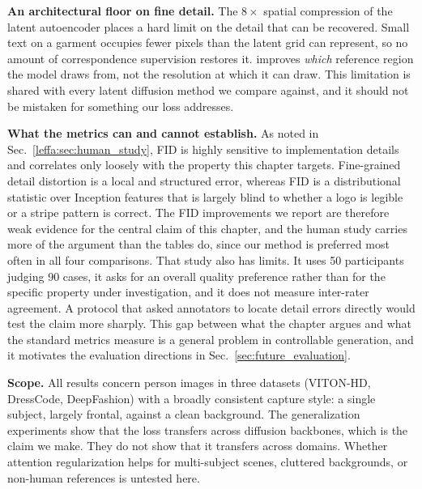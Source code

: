 \noindent \textbf{An architectural floor on fine detail.}
The $8\times$ spatial compression of the latent autoencoder places a hard limit on the detail that can be recovered. Small text on a garment occupies fewer pixels than the latent grid can represent, so no amount of correspondence supervision restores it. \leffa{} improves \emph{which} reference region the model draws from, not the resolution at which it can draw. This limitation is shared with every latent diffusion method we compare against, and it should not be mistaken for something our loss addresses.

\noindent \textbf{What the metrics can and cannot establish.}
As noted in Sec.~\ref{leffa:sec:human_study}, FID is highly sensitive to implementation details~\citep{heusel2017gans, kynkaanniemi2022role, peebles2023scalable} and correlates only loosely with the property this chapter targets. Fine-grained detail distortion is a local and structured error, whereas FID is a distributional statistic over Inception features that is largely blind to whether a logo is legible or a stripe pattern is correct. The FID improvements we report are therefore weak evidence for the central claim of this chapter, and the human study carries more of the argument than the tables do, since our method is preferred most often in all four comparisons. That study also has limits. It uses 50 participants judging 90 cases, it asks for an overall quality preference rather than for the specific property under investigation, and it does not measure inter-rater agreement. A protocol that asked annotators to locate detail errors directly would test the claim more sharply. This gap between what the chapter argues and what the standard metrics measure is a general problem in controllable generation, and it motivates the evaluation directions in Sec.~\ref{sec:future_evaluation}.

\noindent \textbf{Scope.}
All results concern person images in three datasets (VITON-HD, DressCode, DeepFashion) with a broadly consistent capture style: a single subject, largely frontal, against a clean background. The generalization experiments show that the loss transfers across diffusion backbones, which is the claim we make. They do not show that it transfers across domains. Whether attention regularization helps for multi-subject scenes, cluttered backgrounds, or non-human references is untested here.

